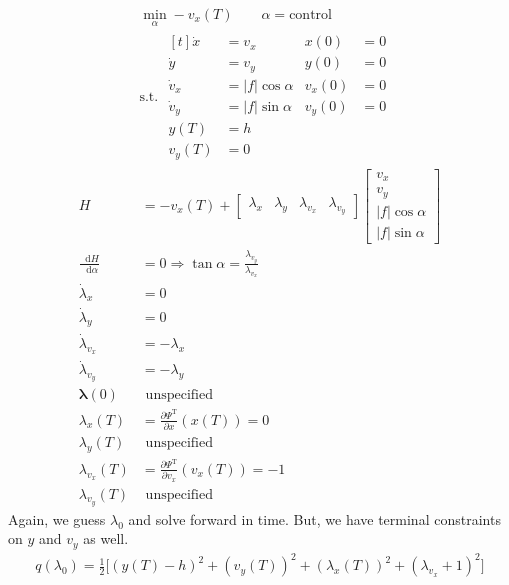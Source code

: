 \documentclass[letterpaper,12pt,titlepage]{report}
\newcommand*\dif{\mathop{}\!\mathrm{d}}
\newcommand{\trans}{^\text{T}}
\newcommand*\pder[2]{\frac{\partial #1}{\partial #2}}
\theoremstyle{plain}
\theoremstyle{definition}
\begin{document}
\begin{align}
    & \min_\alpha -v_x(T) \qquad \alpha=\text{control} \\
    & \text{s.t. } \begin{aligned}[t]
    \dot x &= v_x & x(0) &= 0 \\
    \dot y &= v_y & y(0) &= 0 \\
    \dot v_x &= |f|\cos\alpha & v_x(0) &= 0 \\
    \dot v_y &= |f|\sin\alpha & v_y(0) &= 0 \\
    y(T) &= h \\
    v_y(T) &= 0
    \end{aligned}
\end{align}
\begin{align}
    H &= -v_x(T) + \begin{bmatrix}
        \lambda_x & \lambda_y & \lambda_{v_x} & \lambda_{v_y}
    \end{bmatrix}
    \begin{bmatrix}
        v_x \\ v_y \\ |f|\cos\alpha \\ |f|\sin\alpha
    \end{bmatrix} \\
    \frac{\dif H}{\dif\alpha} &= 0 \Rightarrow \tan\alpha = \frac{\lambda_{v_y}}{\lambda_{v_x}} \\
    \dot\lambda_x &= 0 \\
    \dot\lambda_y &= 0 \\
    \dot\lambda_{v_x} &= -\lambda_x \\
    \dot\lambda_{v_y} &= -\lambda_y \\
    \bm\lambda(0) & \text{ unspecified} \\
    \lambda_x(T) &= \pder{\Psi\trans}{x}(x(T)) = 0 \\
    \lambda_y(T) & \text{ unspecified} \\
    \lambda_{v_x}(T) &= \pder{\Psi\trans}{v_x}(v_x(T)) = -1 \\
    \lambda_{v_y}(T) & \text{ unspecified}
\end{align}
Again, we guess $\lambda_0$ and solve forward in time. But, we have terminal constraints on $y$ and $v_y$ as well.
\begin{gather}
    q(\lambda_0) = \frac12 \Big[ (y(T)-h)^2 + (v_y(T))^2 + (\lambda_x(T))^2 + (\lambda_{v_x}+1)^2 \Big]
\end{gather}
\end{document}
